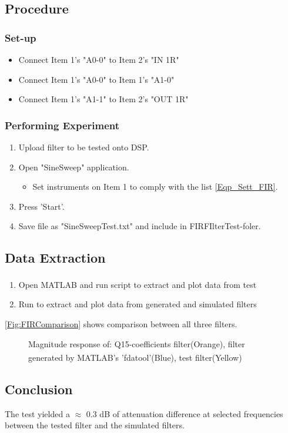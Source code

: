 \subsection{Procedure}
\subsubsection{Set-up}
	\begin{itemize}
		\item Connect Item 1's "A0-0" to Item 2's "IN 1R"
		\item Connect Item 1's "A0-0" to Item 1's "A1-0"
		\item Connect Item 1's "A1-1" to Item 2's "OUT 1R"
	\end{itemize}

\subsubsection{Performing Experiment}
	\begin{enumerate}
		\item Upload filter to be tested onto DSP.
		\item Open "SineSweep" application.
		\begin{itemize}
			 \item Set instruments on Item 1 to comply with the list \autoref{Eqp_Sett_FIR}.
		\end{itemize}
		\item Press 'Start'.
		\item Save file as "SineSweepTest.txt" and include in FIRFIlterTest-foler.
	\end{enumerate}


\subsection{Data Extraction}
	\begin{enumerate}
		\item Open MATLAB\textsuperscript{\textregistered} and run script  to extract and plot data from test
		\item Run  to extract and plot data from generated and simulated filters
	\end{enumerate}

\autoref{Fig:FIRComparison} shows comparison between all three filters.
	
\begin{figure}[H]
	\centering
	
	\caption{Magnitude response of: Q15-coefficients filter(Orange), filter generated by MATLAB\textsuperscript{\textregistered}'s 'fdatool'(Blue), test filter(Yellow)}
	\label{Fig:FIRComparison}
\end{figure}

\subsection{Conclusion}
The test yielded a $\approx$ 0.3 dB of attenuation difference  at selected frequencies between the tested filter and the simulated filters.



